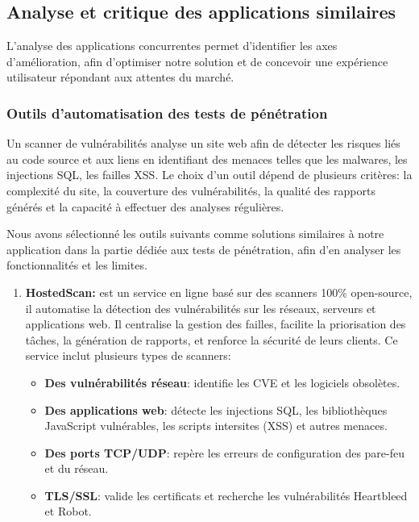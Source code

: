 \begin{justify}
    \subsection{Analyse et critique des applications similaires}
    L’analyse des applications concurrentes permet d’identifier les axes d’amélioration, afin d’optimiser notre solution et de concevoir une expérience utilisateur répondant aux attentes du marché.
    \subsubsection{Outils d’automatisation des tests de pénétration\cite{etdeExistant}}
        Un scanner de vulnérabilités analyse un site web afin de détecter les risques liés au code source et aux liens en identifiant des menaces telles que les malwares, les injections SQL, les failles XSS. Le choix d’un outil dépend de plusieurs critères: la complexité du site, la couverture des vulnérabilités, la qualité des rapports générés et la capacité à effectuer des analyses régulières\cite{etdeExistant}.

        Nous avons sélectionné les outils suivants comme solutions similaires à notre application dans la partie dédiée aux tests de pénétration, afin d’en analyser les fonctionnalités et les limites.
        \begin{enumerate}[label=\alph*)]
            \item \textbf{HostedScan\cite{etdeExistant}:} est un service en ligne basé sur des scanners 100\% open-source, il automatise la détection des vulnérabilités sur les réseaux, serveurs et applications web. Il centralise la gestion des failles, facilite la priorisation des tâches, la génération de rapports, et renforce la sécurité de leurs clients. Ce service inclut plusieurs types de scanners:  
            \begin{itemize}[label=$\bullet$]
                    \item \textbf{Des vulnérabilités réseau}: identifie les \acs{CVE} et les logiciels obsolètes.  
                    \item \textbf{Des applications web}: détecte les injections SQL, les bibliothèques JavaScript vulnérables, les scripts intersites (\acs{XSS}) et autres menaces.  
                    \item \textbf{Des ports TCP/UDP}: repère les erreurs de configuration des pare-feu et du réseau.  
                    \item \textbf{TLS/SSL}: valide les certificats et recherche les vulnérabilités Heartbleed et Robot.  
                \end{itemize}
                

\end{enumerate}
\end{justify}
